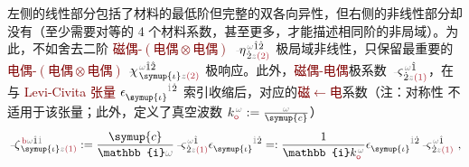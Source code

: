  左侧的线性部分包括了材料的最低阶但完整的双各向异性\cite{langeMultipoleTheoryHehl2015}，但右侧的非线性部分却没有（至少需要对等的 4 个材料系数，甚至更多，才能描述相同阶的非局域）。为此，不如舍去二阶 \textcolor{Maroon}{磁偶-$(\text{电偶}\otimes\text{电偶})$} $\Xint{\begin{smallmatrix} ~ \\ {}^{}_{\mathcolor{gray}{-}} \\ ~ \end{smallmatrix}}{17}{\eta}^{\;\! \mathcolor{gray}{\omega} \hat{1} \hat{2}}_{\;\! \dot{2} \mathcolor{gray}{z} \textcolor{Maroon}{(2)}}$ 极局域非线性，只保留最重要的\textcolor{Maroon}{电偶-$(\text{电偶}\otimes\text{电偶})$} $\Xint{{}^{}_{\mathcolor{gray}{-}}}{23}{\chi}^{\;\! \mathcolor{gray}{\omega} \hat{1} \hat{2}}_{\;\! \symup{\iota} \mathcolor{gray}{z} \textcolor{Maroon}{(2)}}$ 极响应。此外，\textcolor{Maroon}{磁偶-电偶}极系数 $\Xint{\begin{smallmatrix} ~ \\ {}^{}_{\mathcolor{gray}{-}} \\ ~ \end{smallmatrix}}{13}{\varsigma}^{\;\! \mathcolor{gray}{\omega} \hat{1}}_{\;\! \dot{2} \mathcolor{gray}{z} \textcolor{Maroon}{(1)}}$，在与 \textcolor{Maroon}{Levi-Civita 张量} $\epsilon^{\hphantom{\symup{\iota}}\mathcolor{gray}{\dot{1}}\dot{2}}_{\symup{\iota}}$ 索引收缩后，对应的\textcolor{Maroon}{磁$\longleftarrow$电}系数（注：对称性  不适用于该张量；此外，定义了真空波数 $k_{\textcolor{Maroon}{\mathsf{o}}}^{\;\! \mathcolor{gray}{\omega}} := \frac{\mathcolor{gray}{\omega}}{\symup{c}}$）
\begin{align} \label{eq:m<-p}
	\Xint{\begin{smallmatrix} ~ \\ {}^{}_{\mathcolor{gray}{-}} \\ ~ \end{smallmatrix}}{12}{\zeta}^{\;\! \textcolor{Maroon}{\text{b}} \mathcolor{gray}{\omega} \hat{1} \mathcolor{gray}{\dot{1}}}_{\;\! \symup{\iota} \mathcolor{gray}{z} \textcolor{Maroon}{(1)}} := \frac{\symup{c}}{\mathbb{i} \mathcolor{gray}{\omega}} \Xint{\begin{smallmatrix} ~ \\ {}^{}_{\mathcolor{gray}{-}} \\ ~ \end{smallmatrix}}{13}{\varsigma}^{\;\! \mathcolor{gray}{\omega} \hat{1}}_{\;\! \dot{2} \mathcolor{gray}{z} \textcolor{Maroon}{(1)}} \epsilon^{\hphantom{\symup{\iota}}\mathcolor{gray}{\dot{1}}\dot{2}}_{\symup{\iota}} =: \frac{1}{\mathbb{i} k_{\textcolor{Maroon}{\mathsf{o}}}^{\;\! \mathcolor{gray}{\omega}}} \epsilon^{\hphantom{\symup{\iota}}\mathcolor{gray}{\dot{1}}\dot{2}}_{\symup{\iota}} \Xint{\begin{smallmatrix} ~ \\ {}^{}_{\mathcolor{gray}{-}} \\ ~ \end{smallmatrix}}{13}{\varsigma}^{\;\! \mathcolor{gray}{\omega} \hat{1}}_{\;\! \dot{2} \mathcolor{gray}{z} \textcolor{Maroon}{(1)}} ~,
\end{align}
